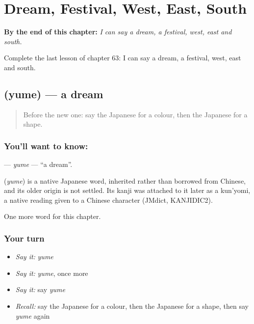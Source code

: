 
\chapter{Dream, Festival, West, East, South}
\label{ch:ja-dream-festival-west-east-south}

\begin{chapteropening}
\textbf{By the end of this chapter:} \emph{I can say a dream, a festival, west, east and south.}

Complete the last lesson of chapter 63: I can say a dream, a festival, west, east and south.
\end{chapteropening}

\section[\texorpdfstring{\ja{ゆめ} (yume)}{ゆめ (yume)}]{ (yume) — a dream}

\label{lesson:JA-C63-yume}



\begin{quote}
Before the new one: say the Japanese for a colour, then the Japanese for a shape.
\end{quote}

\subsection*{You'll want to know: }
\textbf{} — \emph{yume} — \textquotedblleft{}a dream\textquotedblright{}.

\begin{cousinweb}
\textbf{} (\emph{yume}) is a native Japanese word, inherited rather than borrowed from Chinese, and its older origin is not settled. Its kanji was attached to it later as a kun'yomi, a native reading given to a Chinese character (JMdict, KANJIDIC2).
\end{cousinweb}

\begin{grammarlens}[title={What you've built}]
One more word for this chapter.
\end{grammarlens}

\subsection*{Your turn}
\begin{itemize}
\raggedright
  \item \emph{Say it:} \emph{yume}
  \item \emph{Say it:} \emph{yume}, once more
  \item \emph{Say it:} say \emph{yume}
  \item \emph{Recall:} say the Japanese for a colour, then the Japanese for a shape, then say \emph{yume} again
\end{itemize}

